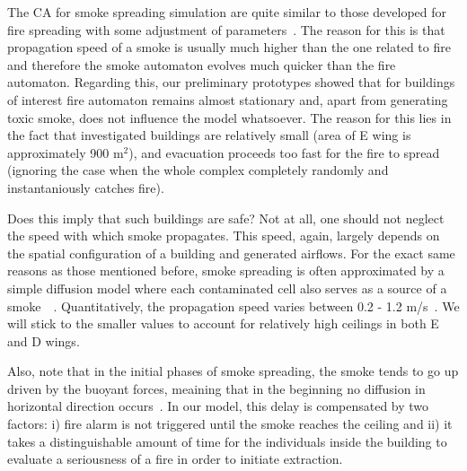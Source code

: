 The CA for smoke spreading simulation are quite similar to those developed for
fire spreading with some adjustment of parameters~\cite{Curiac}.
The reason for this is that propagation speed of a smoke is usually much higher
than the one related to fire and therefore the smoke automaton evolves much
quicker than the fire automaton.
Regarding this, our preliminary prototypes showed that for buildings of
interest fire automaton remains almost stationary and, apart from generating
toxic smoke, does not influence the model whatsoever.
The reason for this lies in the fact that investigated buildings are relatively
small (area of E wing is approximately 900 m$^2$), and evacuation proceeds too
fast for the fire to spread (ignoring the case when the whole complex
completely randomly and instantaniously catches fire).

Does this imply that such buildings are safe?
Not at all, one should not neglect the speed with which smoke propagates.
This speed, again, largely depends on the spatial configuration of a building
and generated airflows.
For the exact same reasons as those mentioned before, smoke spreading is often
approximated by a simple diffusion model where each contaminated cell also
serves as a source of a smoke~\cite{Tissera1}~\cite{Tissera2}.
Quantitatively, the propagation speed varies between 0.2 - 1.2 m/s~\cite{Smoke}.
We will stick to the smaller values to account for relatively high ceilings in
both E and D wings.

Also, note that in the initial phases of smoke spreading, the smoke tends to go
up driven by the buoyant forces, meaining that in the beginning no diffusion
in horizontal direction occurs~\cite{Curiac}.
In our model, this delay is compensated by two factors: i) fire alarm is not
triggered until the smoke reaches the ceiling and ii) it takes a distinguishable
amount of time for the individuals inside the building to evaluate a
seriousness of a fire in order to initiate extraction.

